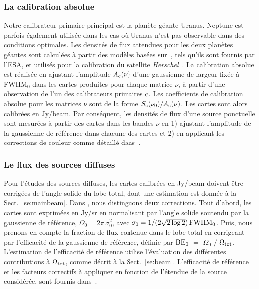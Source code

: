 \subsubsection{La calibration absolue}
Notre calibrateur primaire principal est la planète géante
Uranus. Neptune est parfois également utilisée dans les cas où Uranus
n'est pas observable dans des conditions optimales. Les densités de
flux attendues pour les deux planètes géantes sont calculées à partir
des modèles basées sur~\citet{Morenothesis}, tels qu'ils sont fournis par
l'ESA, et utilisés pour la calibration du satellite
\emph{Herschel}~\citep{Bendo2013}. La calibration absolue est réalisée
en ajustant l'amplitude $A_{\rm{c}}(\nu)$ d'une gaussienne de largeur
fixée à FWHM$_0$ dans les cartes produites pour chaque matrice $\nu$,
à partir d'une observation de l'un des calibrateurs primaires
$\rm{c}$. Les coefficients de calibration absolue pour les matrices
$\nu$ sont de la forme $S_{\rm{c}}(\nu_0) / A_{\rm{c}}(\nu)$. Les
cartes sont alors calibrées en Jy/beam. Par conséquent, les densités
de flux d'une source ponctuelle sont mesurées à partir des cartes dans
les bandes $\nu$ en 1) ajustant l'amplitude de la gaussienne de
référence dans chacune des cartes et 2) en applicant les corrections
de couleur comme détaillé dans~\citet{Perotto2019}.

\subsubsection{Le flux des sources diffuses}

Pour l'études des sources diffuses, les cartes calibrées en Jy/beam
doivent être corrigées de l'angle solide du lobe total, dont une
estimation est donnée à la Sect.~\ref{se:mainbeam}. Dans
\citet{Perotto2019}, nous distinguons deux corrections. Tout d'abord,
les cartes sont exprimées en Jy/sr en normalisant par l'angle solide soutendu
par la gaussienne de référence, $\Omega_0 = 2\pi \, \sigma_0^2$, avec
$\sigma_0 = 1/(2\sqrt{2 \log{2}})\, \rm{FWHM}_0$. Puis, nous prenons
en compte la fraction de flux contenue dans le lobe total en
corrigeant par l'efficacité de la gaussienne de référence, définie par
$\rm{BE}_{0}$ $=$ $\Omega_{0}$ $/$ $\Omega_{\rm{tot}}$.
L'estimation de l'efficacité
de référence utilise l'évaluation des différentes contributions à
$\Omega_{\rm{tot}}$, comme décrit à la
Sect.~\ref{se:beam}. L'efficacité de référence et les facteurs
correctifs à appliquer en fonction de l'étendue de la source
considérée, sont fournis dans~\citet{Perotto2019}.


